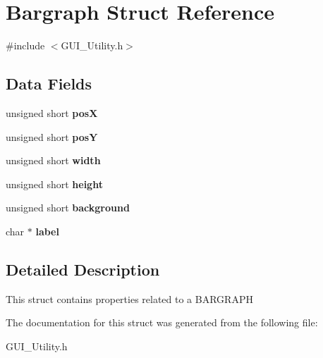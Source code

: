 \hypertarget{struct_bargraph}{}\section{Bargraph Struct Reference}
\label{struct_bargraph}


{\ttfamily \#include $<$G\+U\+I\+\_\+\+Utility.\+h$>$}

\subsection*{Data Fields}
\begin{DoxyCompactItemize}
\item 
\mbox{\label{struct_bargraph_a9558c3e944877dba9fed6337f613e3f1}} 
unsigned short {\bfseries posX}
\item 
\mbox{\label{struct_bargraph_aa7280c1f19a34782a24ce2bbb2d61a37}} 
unsigned short {\bfseries posY}
\item 
\mbox{\label{struct_bargraph_a4812fa5c2cd022a7a686673c107fe11f}} 
unsigned short {\bfseries width}
\item 
\mbox{\label{struct_bargraph_ab0034d46ad8b847d0f0f657c295aa8e9}} 
unsigned short {\bfseries height}
\item 
\mbox{\label{struct_bargraph_ad60e6af87553a157aa3fd4a63d0328e6}} 
unsigned short {\bfseries background}
\item 
\mbox{\label{struct_bargraph_a9469871ca0956d3bf9ddc1ac8f1a2165}} 
char $\ast$ {\bfseries label}
\end{DoxyCompactItemize}


\subsection{Detailed Description}
This struct contains properties related to a B\+A\+R\+G\+R\+A\+PH 

The documentation for this struct was generated from the following file\+:\begin{DoxyCompactItemize}
\item 
G\+U\+I\+\_\+\+Utility.\+h\end{DoxyCompactItemize}
